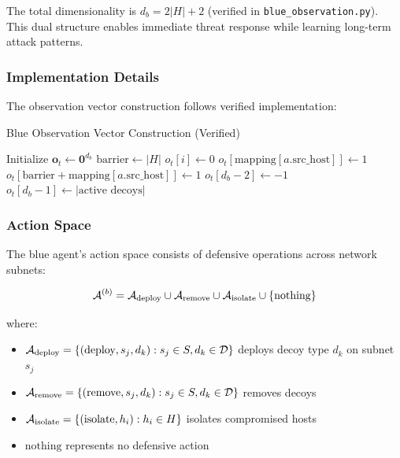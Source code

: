 \documentclass[11pt]{article}
\theoremstyle{definition}
\theoremstyle{plain}
\begin{document}
The total dimensionality is $d_b = 2|H| + 2$ (verified in \texttt{blue\_observation.py}). This dual structure enables immediate threat response while learning long-term attack patterns.

\subsubsection{Implementation Details}
The observation vector construction follows verified implementation:

\begin{algorithm}
\caption{Blue Observation Vector Construction (Verified)}
\begin{algorithmic}[1]
\STATE Initialize $\mathbf{o}_t \leftarrow \mathbf{0}^{d_b}$
\STATE $\text{barrier} \leftarrow |H|$
    \STATE $o_t[i] \leftarrow 0$ 
\ENDFOR
{}
        \STATE $o_t[\text{mapping}[a.\text{src\_host}]] \leftarrow 1$
        \STATE $o_t[\text{barrier} + \text{mapping}[a.\text{src\_host}]] \leftarrow 1$ 
    \ENDIF
\ENDFOR
\STATE $o_t[d_b-2] \leftarrow -1$ 
\STATE $o_t[d_b-1] \leftarrow |\text{active decoys}|$ 
\end{algorithmic}
\end{algorithm}

\subsubsection{Action Space}
The blue agent's action space consists of defensive operations across network subnets:

\begin{equation}
\mathcal{A}^{(b)} = \mathcal{A}_{\text{deploy}} \cup \mathcal{A}_{\text{remove}} \cup \mathcal{A}_{\text{isolate}} \cup \{\text{nothing}\}
\end{equation}

where:
\begin{itemize}
    \item $\mathcal{A}_{\text{deploy}} = \{(\text{deploy}, s_j, d_k) : s_j \in S, d_k \in \mathcal{D}\}$ deploys decoy type $d_k$ on subnet $s_j$
    \item $\mathcal{A}_{\text{remove}} = \{(\text{remove}, s_j, d_k) : s_j \in S, d_k \in \mathcal{D}\}$ removes decoys
    \item $\mathcal{A}_{\text{isolate}} = \{(\text{isolate}, h_i) : h_i \in H\}$ isolates compromised hosts
    \item $\text{nothing}$ represents no defensive action
\end{itemize}
\end{document}
